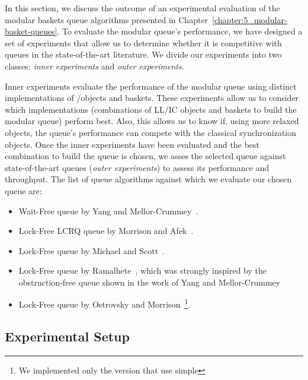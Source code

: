 
In this section, we discuss the outcome of an experimental evaluation of the modular baskets queue algorithms presented in Chapter~\ref{chapter:5_modular-basket-queues}. To evaluate the modular queue's performance, we have designed a set of experiments that allow us to determine whether it is competitive with queues in the state-of-the-art literature. We divide our experiments into two classes: \textit{inner experiments} and \textit{outer experiments}.


Inner experiments evaluate the performance of the modular queue using distinct implementations of \LL/\IC objects and baskets. These experiments allow us to consider which implementations (combinations of LL/IC objects and baskets to build the modular queue) perform best. Also, this allows us to know if, using more relaxed objects, the queue's performance can compete with the classical synchronization objects. Once the inner experiments have been evaluated and the best combination to build the queue is chosen, we asses the selected queue against state-of-the-art queues (\textit{outer experiments}) to assess its performance and throughput. The list of queue algorithms against which we evaluate our chosen queue are:

\begin{itemize}
    \item Wait-Free queue by Yang and Mellor-Crummey~\cite{DBLP_conf_ppopp_YangM16}.
    \item Lock-Free LCRQ queue by Morrison and Afek~\cite{ppopp2013x86queues}.
    \item Lock-Free queue by Michael and Scott~\cite{DBLP_conf_podc_MichaelS96}.
    \item Lock-Free queue by Ramalhete~\cite{Ramalhete_Correia_MPMC_2016}, which was strongly inspired by the obstruction\hyp{}free queue shown in the work of Yang and Mellor-Crummey~\cite{DBLP_conf_ppopp_YangM16}
    \item Lock-Free queue by Ostrovsky and Morrison~\cite{scalingconcurrent2020}\footnote{We implemented only the version that use simple \CAS}.
\end{itemize}

\subsection{\label{subsec:queue-experimental-setup}Experimental Setup}
